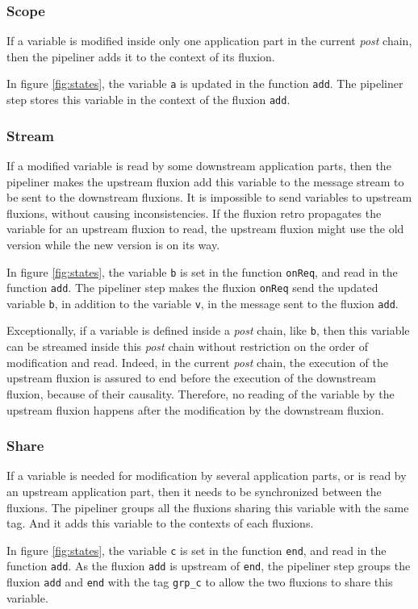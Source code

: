 \subsubsection{Scope}
If a variable is modified inside only one application part in the current \textit{post} chain, then the pipeliner adds it to the context of its fluxion.

In figure \ref{fig:states}, the variable \texttt{a} is updated in the function \texttt{add}.
The pipeliner step stores this variable in the context of the fluxion \texttt{add}.

\subsubsection{Stream}
If a modified variable is read by some downstream application parts, then the pipeliner makes the upstream fluxion add this variable to the message stream to be sent to the downstream fluxions.
It is impossible to send variables to upstream flux\-ions, without causing inconsistencies.
If the fluxion retro propagates the variable for an upstream fluxion to read, the upstream fluxion might use the old version while the new version is on its way.

In figure \ref{fig:states}, the variable \texttt{b} is set in the function \texttt{onReq}, and read in the function \texttt{add}.
The pipeliner step makes the fluxion \texttt{onReq} send the updated variable \texttt{b}, in addition to the variable \texttt{v}, in the message sent to the fluxion \texttt{add}.

Exceptionally, if a variable is defined inside a \textit{post} chain, like \texttt{b}, then this variable can be streamed inside this \textit{post} chain without restriction on the order of modification and read.
Indeed, in the current \textit{post} chain, the execution of the upstream fluxion is assured to end before the execution of the downstream fluxion, because of their causality.
Therefore, no reading of the variable by the upstream fluxion happens after the modification by the downstream fluxion.

\subsubsection{Share}
If a variable is needed for modification by several application parts, or is read by an upstream application part, then it needs to be synchronized between the fluxions.
The pipeliner groups all the fluxions sharing this variable with the same tag.
And it adds this variable to the contexts of each fluxions.

In figure \ref{fig:states}, the variable \texttt{c} is set in the function \texttt{end}, and read in the function \texttt{add}.
As the fluxion \texttt{add} is upstream of \texttt{end}, the pipeliner step groups the fluxion \texttt{add} and \texttt{end} with the tag \texttt{grp\_c} to allow the two fluxions to share this variable.